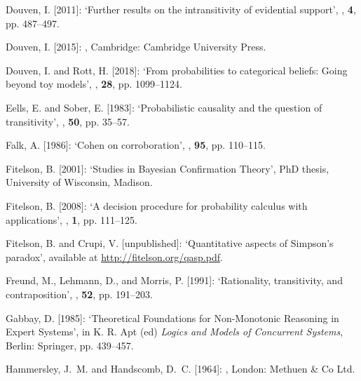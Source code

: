 \documentclass[a4paper,11pt]{article}
\begin{document}
\begin{thebibliography}{}
Douven, I. [2011]:
\newblock `Further results on the intransitivity of evidential support',
, \textbf{4}, pp. 487--497.

Douven, I. [2015]:
,
\newblock Cambridge: Cambridge University Press.

Douven, I. and Rott, H. [2018]:
\newblock `From probabilities to categorical beliefs: Going beyond toy models',
, \textbf{28}, pp. 1099--1124.

Eells, E. and Sober, E. [1983]:
\newblock `Probabilistic causality and the question of transitivity',
, \textbf{50}, pp. 35--57.

Falk, A. [1986]:
\newblock `Cohen on corroboration',
, \textbf{95}, pp. 110--115.

Fitelson, B. [2001]:
\newblock `Studies in Bayesian Confirmation Theory',
\newblock PhD thesis, University of Wisconsin, Madison.

Fitelson, B. [2008]:
\newblock `A decision procedure for probability calculus with applications',
, \textbf{1}, pp. 111--125.

Fitelson, B. and Crupi, V. [unpublished]:
\newblock `Quantitative aspects of {S}impson’s paradox',
\newblock available at \href{http://fitelson.org/qasp.pdf}{http://fitelson.org/qasp.pdf}.

Freund, M., Lehmann, D., and Morris, P. [1991]:
\newblock `Rationality, transitivity, and contraposition',
, \textbf{52}, pp. 191--203.

Gabbay, D. [1985]:
\newblock `Theoretical Foundations for Non-Monotonic Reasoning in Expert
  Systems', in K. R. Apt (ed) \emph{Logics and Models of Concurrent Systems},
\newblock Berlin: Springer, pp. 439–457.

Hammersley, J.~M. and Handscomb, D.~C. [1964]:
,
\newblock London: Methuen \& Co Ltd.


\end{thebibliography}
\end{document}
